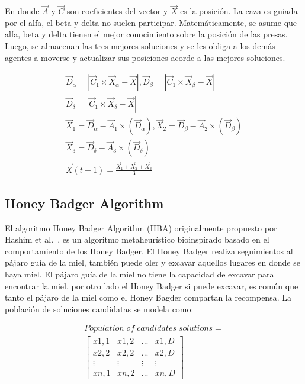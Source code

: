 \documentclass[conference]{IEEEtran}
\begin{document}
\noindent En donde $\vec{A}$ y $\vec{C}$ son coeficientes del vector y $\vec{X}$ es la posición. La caza es guiada por el alfa, el beta y delta no suelen participar. Matemáticamente, se asume que alfa, beta y delta tienen el mejor conocimiento sobre la posición de las presas. Luego, se almacenan las tres mejores soluciones y se les obliga a los demás agentes a moverse y actualizar sus posiciones acorde a las mejores soluciones.


\begin{equation}
	\begin{gathered}
		\vec{D}_{\alpha} = |\vec{C}_1 \times \vec{X}_{\alpha} -\vec{X}|, \vec{D}_{\beta} = |\vec{C}_1 \times \vec{X}_{\beta} -\vec{X}| \\
		\vec{D}_{\delta} = |\vec{C}_1 \times \vec{X}_{\delta} -\vec{X}|\\
		\vec{X}_1=\vec{D}_{\alpha}-\vec{A}_1 \times (\vec{D}_{\alpha}), \vec{X}_2=\vec{D}_{\beta}-\vec{A}_2 \times (\vec{D}_{\beta})\\
		\vec{X}_3=\vec{D}_{\delta}-\vec{A}_3 \times (\vec{D}_{\delta}) \\
		\vec{X}(t+1) = \frac{\vec{X}_1+\vec{X}_2+\vec{X}_3}{3}
	\end{gathered}
	\label{eq26}
\end{equation}


\subsection{Honey Badger Algorithm}

\noindent El algoritmo Honey Badger Algorithm (HBA) originalmente propuesto por Hashim et al.~\cite{Hashim2022}, es un algoritmo metaheurístico bioinspirado basado en el comportamiento de los Honey Badger. El Honey Badger realiza seguimientos al pájaro guía de la miel, también puede oler y excavar aquellos lugares en donde se haya miel. El pájaro guía de la miel no tiene la capacidad de excavar para encontrar la miel, por otro lado el Honey Badger si puede excavar, es común que tanto el pájaro de la miel como el Honey Bagder compartan la recompensa. La población de soluciones candidatas se modela como:

\begin{equation}
	\begin{gathered}
		Population \;of\; candidates\; solutions=\\\begin{bmatrix}
			x1,1 & x1,2 & ... & x1,D  \\
			x2,2 & x2,2 & ... & x2,D  \\
			\vdots & \vdots & \vdots & \vdots \\
			xn,1 & xn,2 & ... & xn,D
		\end{bmatrix}
	\end{gathered}
	\label{eq27}
\end{equation}
\end{document}
